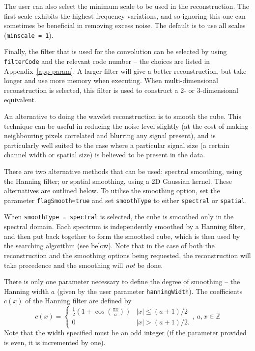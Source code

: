 The user can also select the minimum scale to be used in the
reconstruction. The first scale exhibits the highest frequency
variations, and so ignoring this one can sometimes be beneficial in
removing excess noise. The default is to use all scales
(\texttt{minscale = 1}).

Finally, the filter that is used for the convolution can be selected
by using \texttt{filterCode} and the relevant code number -- the
choices are listed in Appendix~\ref{app-param}. A larger filter will
give a better reconstruction, but take longer and use more memory when
executing. When multi-dimensional reconstruction is selected, this
filter is used to construct a 2- or 3-dimensional equivalent.

\label{sec-smoothing}

An alternative to doing the wavelet reconstruction is to smooth the
cube.  This technique can be useful in reducing the noise level
slightly (at the cost of making neighbouring pixels correlated and
blurring any signal present), and is particularly well suited to the
case where a particular signal size (\ie a certain channel width or
spatial size) is believed to be present in the data.

There are two alternative methods that can be used: spectral
smoothing, using the Hanning filter; or spatial smoothing, using a 2D
Gaussian kernel. These alternatives are outlined below. To utilise the
smoothing option, set the parameter \texttt{flagSmooth=true} and set
\texttt{smoothType} to either \texttt{spectral} or \texttt{spatial}.


When \texttt{smoothType = spectral} is selected, the cube is smoothed
only in the spectral domain. Each spectrum is independently smoothed
by a Hanning filter, and then put back together to form the smoothed
cube, which is then used by the searching algorithm (see below). Note
that in the case of both the reconstruction and the smoothing options
being requested, the reconstruction will take precedence and the
smoothing will \emph{not} be done.

There is only one parameter necessary to define the degree of
smoothing -- the Hanning width $a$ (given by the user parameter
\texttt{hanningWidth}). The coefficients $c(x)$ of the Hanning filter
are defined by
\[
c(x) = 
  \begin{cases}
   \frac{1}{2}\left(1+\cos(\frac{\pi x}{a})\right) &|x| \leq (a+1)/2\\
   0                                               &|x| > (a+1)/2.
  \end{cases},\ a,x \in \mathbb{Z}
\]
Note that the width specified must be an
odd integer (if the parameter provided is even, it is incremented by
one).

